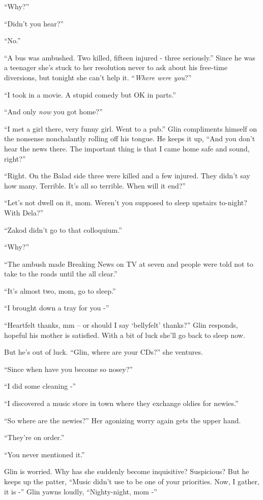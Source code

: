 \documentclass[twoside,11pt]{book}
\begin{document}
``Why?''

``Didn't you hear?''

``No.''

``A bus was ambushed. Two killed, fifteen injured - three seriously.'' Since he was a teenager
she's stuck to her resolution never to ask about his
free-time diversions, but tonight she can't help it.
``\textit{Where were you}?''

``I took in a movie. A stupid comedy but OK in
parts.''

``And only \textit{now} you got home?''

``I met a girl there, very funny girl. Went to a pub.'' Glin compliments himself on the
nonsense nonchalantly rolling off his tongue. He keeps it up, ``And you don't hear the news there. The
important thing is that I came home safe and sound, right?''

``Right. On the Balad side three were killed and a few injured. They didn't say how many. Terrible. It's
all so terrible. When will it end?''

``Let's not dwell on it, mom. Weren't you supposed to sleep upstairs to-night? With Dela?''

``Zakod didn't go to that colloquium.''

``Why?''

``The ambush made Breaking News on TV at seven and people were told not to take to the roads until the all
clear.''

``It's almost two, mom, go to sleep.''

``I brought down a tray for you -''

``Heartfelt thanks, mm -- or should I say `bellyfelt' thanks?'' Glin responds, hopeful his
mother is satisfied. With a bit of luck she'll go back to sleep now.

But he's out of luck. ``Glin, where are your CDs?'' she ventures.

``Since when have you become so nosey?''

``I did some cleaning -''

``I discovered a music store in town where they exchange oldies for newies.''

``So where are the newies?'' Her agonizing worry again gets the upper hand.

``They're on order.''

``You never mentioned it.''

Glin is worried. Why has she suddenly become inquisitive? Suspicious? But he keeps up the patter, ``Music
didn't use to be one of your priorities. Now, I gather, it is -'' Glin yawns
loudly, ``Nighty-night, mom -''
\end{document}
